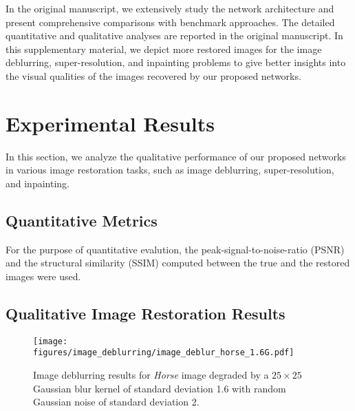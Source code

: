 \documentclass[10pt,journal,compsoc]{IEEEtran}
\begin{document}
In the original manuscript, we extensively study the network architecture and present comprehensive comparisons with benchmark approaches. The detailed quantitative and qualitative analyses are reported in the original manuscript. In this supplementary material, we depict more restored images for the image deblurring, super-resolution, and inpainting problems to give better insights into the visual qualities of the images recovered by our proposed networks.





\section{Experimental Results}
\label{sec:expe_results_supp}

In this section, we analyze the qualitative performance of our proposed networks in various image restoration tasks, such as image deblurring, super-resolution, and inpainting.



\subsection{Quantitative Metrics}

For the purpose of quantitative evalution, the peak-signal-to-noise-ratio (PSNR) and the structural similarity (SSIM)
computed between the true and the restored images were used.



\subsection{Qualitative Image Restoration Results}
\label{sec:results_supp}





\begin{figure*}[b!]
\begin{centering}
\texttt{[image: figures/image\_deblurring/image\_deblur\_horse\_1.6G.pdf]}
\end{centering}

\caption{Image deblurring results for \textit{Horse} image degraded by a $25 \times 25$ Gaussian blur kernel of standard deviation 1.6 with random Gaussian noise of standard deviation $2$.}
\label{fig:image_deblurG_supp}
\end{figure*}
\end{document}
